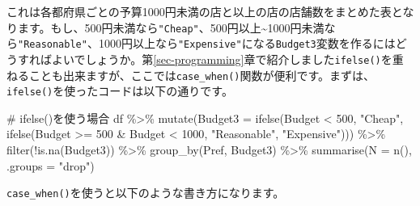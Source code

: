 \documentclass[
  a4paper,
  pandoc,
  ja=standard,
  jafont=haranoaji]{bxjsbook}
\newenvironment{Shaded}{\begin{snugshade}}{\end{snugshade}}
\newcommand{\AttributeTok}[1]{\textcolor[rgb]{0.00,0.48,0.65}{#1}}
\newcommand{\CommentTok}[1]{\textcolor[rgb]{0.37,0.37,0.37}{#1}}
\newcommand{\DecValTok}[1]{\textcolor[rgb]{0.68,0.00,0.00}{#1}}
\newcommand{\FunctionTok}[1]{\textcolor[rgb]{0.28,0.35,0.67}{#1}}
\newcommand{\NormalTok}[1]{\textcolor[rgb]{0.00,0.48,0.65}{#1}}
\newcommand{\SpecialCharTok}[1]{\textcolor[rgb]{0.37,0.37,0.37}{#1}}
\newcommand{\StringTok}[1]{\textcolor[rgb]{0.13,0.47,0.30}{#1}}
\begin{document}
これは各都府県ごとの予算1000円未満の店と以上の店の店舗数をまとめた表となります。もし、500円未満なら\texttt{"Cheap"}、500円以上\textasciitilde1000円未満なら\texttt{"Reasonable"}、1000円以上なら\texttt{"Expensive"}になる\texttt{Budget3}変数を作るにはどうすればよいでしょうか。第\ref{sec-programming}章で紹介しました\texttt{ifelse()}を重ねることも出来ますが、ここでは\texttt{case\_when()}関数が便利です。まずは、\texttt{ifelse()}を使ったコードは以下の通りです。

\begin{Shaded}
\begin{Highlighting}[numbers=left,,]
\CommentTok{\# ifelse()を使う場合}
\NormalTok{df }\SpecialCharTok{\%\textgreater{}\%} 
  \FunctionTok{mutate}\NormalTok{(}\AttributeTok{Budget3 =} \FunctionTok{ifelse}\NormalTok{(Budget }\SpecialCharTok{\textless{}} \DecValTok{500}\NormalTok{, }\StringTok{"Cheap"}\NormalTok{, }
                          \FunctionTok{ifelse}\NormalTok{(Budget }\SpecialCharTok{\textgreater{}=} \DecValTok{500} \SpecialCharTok{\&}\NormalTok{ Budget }\SpecialCharTok{\textless{}} \DecValTok{1000}\NormalTok{, }\StringTok{"Reasonable"}\NormalTok{,}
                                 \StringTok{"Expensive"}\NormalTok{))) }\SpecialCharTok{\%\textgreater{}\%}
  \FunctionTok{filter}\NormalTok{(}\SpecialCharTok{!}\FunctionTok{is.na}\NormalTok{(Budget3)) }\SpecialCharTok{\%\textgreater{}\%}
  \FunctionTok{group\_by}\NormalTok{(Pref, Budget3) }\SpecialCharTok{\%\textgreater{}\%}
  \FunctionTok{summarise}\NormalTok{(}\AttributeTok{N =} \FunctionTok{n}\NormalTok{(),         }
            \AttributeTok{.groups =} \StringTok{"drop"}\NormalTok{)}
\end{Highlighting}
\end{Shaded}

\texttt{case\_when()}を使うと以下のような書き方になります。
\end{document}
